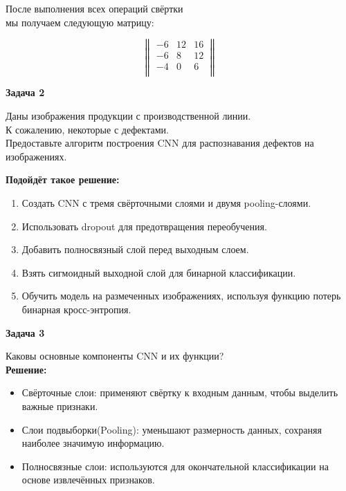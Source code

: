 \begin{description}
	      После выполнения всех операций свёртки\\
	      мы получаем следующую матрицу:

	      $$
		      \begin{Vmatrix}
			      -6 & 12 & 16 \\
			      -6 & 8  & 12 \\
			      -4 & 0  & 6  \\
		      \end{Vmatrix}
	      $$

	      \newpage
	      \textbf{Задача 2}

	      Даны изображения продукции с производственной линии.\\
	      К сожалению, некоторые с дефектами.\\
	      Предоставьте алгоритм построения CNN для распознавания дефектов на изображениях.

	      \textbf{Подойдёт такое решение:}

	      \begin{enumerate}
		      \item Создать CNN с тремя свёрточными слоями и двумя pooling-слоями.
		      \item Использовать dropout для предотвращения переобучения.
		      \item Добавить полносвязный слой перед выходным слоем.
		      \item Взять сигмоидный выходной слой для бинарной классификации.
		      \item Обучить модель на размеченных изображениях, используя функцию потерь бинарная кросс-энтропия.\end{enumerate}

	      \textbf{Задача 3}

	      Каковы основные компоненты CNN и их функции?\\
	      \textbf{Решение:}
	      \begin{itemize}
		      \item Свёрточные слои: применяют свёртку к входным данным, чтобы выделить важные признаки.
		      \item Слои подвыборки(Pooling): уменьшают размерность данных, сохраняя наиболее значимую информацию.
		      \item Полносвязные слои: используются для окончательной классификации на основе извлечённых признаков.
	      \end{itemize}

\end{description}


